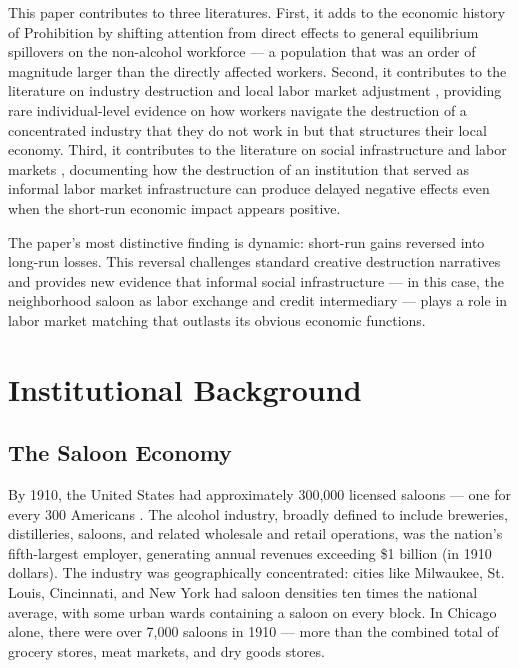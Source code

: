 \documentclass[12pt]{article}
\begin{document}
This paper contributes to three literatures. First, it adds to the economic history of Prohibition by shifting attention from direct effects to general equilibrium spillovers on the non-alcohol workforce --- a population that was an order of magnitude larger than the directly affected workers. Second, it contributes to the literature on industry destruction and local labor market adjustment \citep{autor2003, topalova2010, blanchard1992}, providing rare individual-level evidence on how workers navigate the destruction of a concentrated industry that they do not work in but that structures their local economy. Third, it contributes to the literature on social infrastructure and labor markets \citep{powers1998}, documenting how the destruction of an institution that served as informal labor market infrastructure can produce delayed negative effects even when the short-run economic impact appears positive.

The paper's most distinctive finding is dynamic: short-run gains reversed into long-run losses. This reversal challenges standard creative destruction narratives and provides new evidence that informal social infrastructure --- in this case, the neighborhood saloon as labor exchange and credit intermediary --- plays a role in labor market matching that outlasts its obvious economic functions.


\section{Institutional Background}
\label{sec:background}

\subsection{The Saloon Economy}

By 1910, the United States had approximately 300,000 licensed saloons --- one for every 300 Americans \citep{okrent2010}. The alcohol industry, broadly defined to include breweries, distilleries, saloons, and related wholesale and retail operations, was the nation's fifth-largest employer, generating annual revenues exceeding \$1 billion (in 1910 dollars). The industry was geographically concentrated: cities like Milwaukee, St. Louis, Cincinnati, and New York had saloon densities ten times the national average, with some urban wards containing a saloon on every block. In Chicago alone, there were over 7,000 saloons in 1910 --- more than the combined total of grocery stores, meat markets, and dry goods stores.
\end{document}
